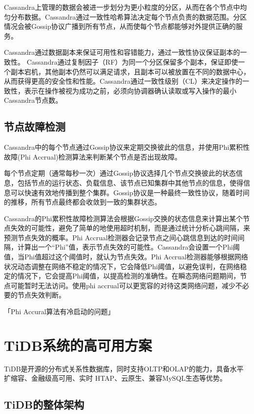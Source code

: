 Cassandra上管理的数据会被进一步划分为更小粒度的分区，从而在各个节点中均匀分布数据。Cassandra通过一致性哈希算法\cite{karger1997consistent}决定每个节点负责的数据范围。分区情况会被Gossip协议广播到所有节点，从而使每个节点都能够对外提供正确的服务。

Cassandra通过数据副本来保证可用性和容错能力，通过一致性协议保证副本的一致性。
Cassandra通过复制因子（RF）为同一个分区保留多个副本，保证即使一个副本宕机，其他副本仍然可以满足请求，且副本可以被放置在不同的数据中心，从而获得更高的安全性和性能。Cassandra通过一致性级别（CL）来决定操作的一致性，表示在操作被视为成功之前，必须向协调器确认读取或写入操作的最小Cassandra节点数。


\subsection{节点故障检测}\label{sec:cassandra-failure-detecttion}

Cassandra中的每个节点通过Gossip协议来定期交换彼此的信息，并使用Phi累积性故障(Phi Accrual)检测算法\cite{hayashibara2004spl}来判断某个节点是否出现故障。

每个节点定期（通常每秒一次）通过Gossip协议选择几个节点交换彼此的状态信息，包括节点的运行状态、负载信息、该节点已知集群中其他节点的信息，使得信息可以快速有效地传播到整个集群。Gossip协议是一种最终一致性协议，随着时间的推移，所有节点最终都会收敛到一致的集群状态。

Cassandra的Phi累积性故障检测算法会根据Gossip交换的状态信息来计算出某个节点失效的可能性，避免了简单的地使用超时机制，而是通过统计分析心跳间隔，来预测节点失效的概率。Phi Accrual检测器会记录节点之间心跳信息到达的时间间隔，计算出一个“Phi”值，表示节点失效的可能性。Cassandra会设置一个Phi阈值，当Phi值超过这个阈值时，就认为节点失效。Phi Accrual检测器能够根据网络状况动态调整在网络不稳定的情况下，它会降低Phi阈值，以避免误判，在网络稳定的情况下，它会提高Phi阈值，以提高检测的准确性。在瞬态网络问题期间，节点可能暂时无法访问。使用phi accrual可以更宽容的对待这类网络问题，减少不必要的节点失效判断。

「Phi Accural算法有冷启动的问题」

\section{TiDB系统的高可用方案}
TiDB\cite{huang2020tidb}是开源的分布式关系性数据库，同时支持OLTP和OLAP的能力，具备水平扩缩容、金融级高可用、实时 HTAP、云原生、兼容MySQL生态等优势。

\subsection{TiDB的整体架构}

